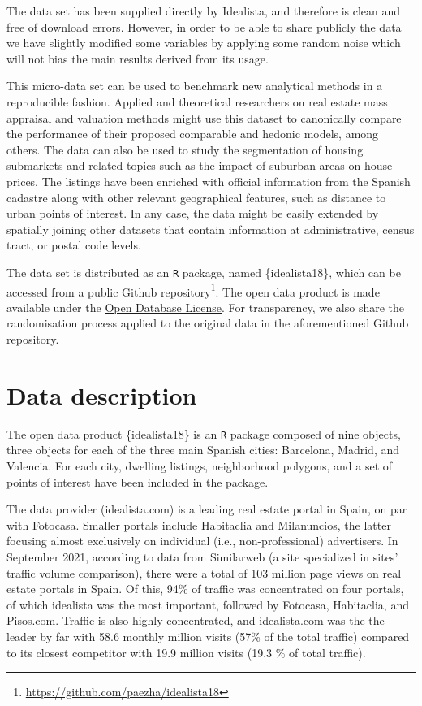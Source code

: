 \documentclass[Royal,times,sageh]{sagej}
\begin{document}
The data set has been supplied directly by Idealista, and therefore is
clean and free of download errors. However, in order to be able to share
publicly the data we have slightly modified some variables by applying
some random noise which will not bias the main results derived from its
usage.

This micro-data set can be used to benchmark new analytical methods in a
reproducible fashion. Applied and theoretical researchers on real estate
mass appraisal and valuation methods might use this dataset to
canonically compare the performance of their proposed comparable and
hedonic models, among others. The data can also be used to study the
segmentation of housing submarkets and related topics such as the impact
of suburban areas on house prices. The listings have been enriched with
official information from the Spanish cadastre along with other relevant
geographical features, such as distance to urban points of interest. In
any case, the data might be easily extended by spatially joining other
datasets that contain information at administrative, census tract, or
postal code levels.

The data set is distributed as an \texttt{R} package, named
\{idealista18\}, which can be accessed from a public Github
repository\footnote{\url{https://github.com/paezha/idealista18}}. The
open data product is made available under the
\href{http://opendatacommons.org/licenses/odbl/1.0/}{Open Database License}.
For transparency, we also share the randomisation process applied to the
original data in the aforementioned Github repository.

\hypertarget{data-description}{%
\section{Data description}\label{data-description}}

The open data product \{idealista18\} is an \texttt{R} package composed
of nine objects, three objects for each of the three main Spanish
cities: Barcelona, Madrid, and Valencia. For each city, dwelling
listings, neighborhood polygons, and a set of points of interest have
been included in the package.

The data provider (idealista.com) is a leading real estate portal in
Spain, on par with Fotocasa. Smaller portals include Habitaclia and
Milanuncios, the latter focusing almost exclusively on individual (i.e.,
non-professional) advertisers. In September 2021, according to data from
Similarweb (a site specialized in sites' traffic volume comparison),
there were a total of 103 million page views on real estate portals in
Spain. Of this, 94\% of traffic was concentrated on four portals, of
which idealista was the most important, followed by Fotocasa,
Habitaclia, and Pisos.com. Traffic is also highly concentrated, and
idealista.com was the the leader by far with 58.6 monthly million visits
(57\% of the total traffic) compared to its closest competitor with 19.9
million visits (19.3 \% of total traffic).
\end{document}
